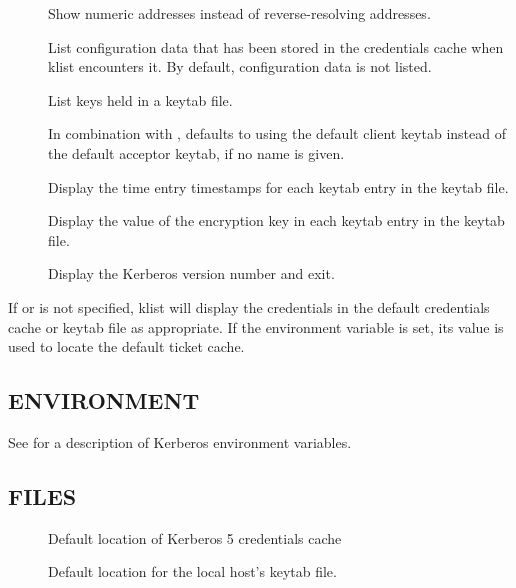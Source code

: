 \documentclass[letterpaper,10pt,english]{sphinxmanual}
\begin{document}
\begin{description}
\item[{}] \leavevmode
Show numeric addresses instead of reverse-resolving addresses.

\item[{}] \leavevmode
List configuration data that has been stored in the credentials
cache when klist encounters it.  By default, configuration data
is not listed.

\item[{}] \leavevmode
List keys held in a keytab file.

\item[{}] \leavevmode
In combination with , defaults to using the default client
keytab instead of the default acceptor keytab, if no name is
given.

\item[{}] \leavevmode
Display the time entry timestamps for each keytab entry in the
keytab file.

\item[{}] \leavevmode
Display the value of the encryption key in each keytab entry in
the keytab file.

\item[{}] \leavevmode
Display the Kerberos version number and exit.

\end{description}

If  or  is not specified, klist will display
the credentials in the default credentials cache or keytab file as
appropriate.  If the  environment variable is set, its
value is used to locate the default ticket cache.


\subsection{ENVIRONMENT}
\label{\detokenize{user/user_commands/klist:environment}}
See {\hyperref[\detokenize{user/user_config/kerberos:kerberos-7}]{}} for a description of Kerberos environment
variables.


\subsection{FILES}
\label{\detokenize{user/user_commands/klist:files}}\begin{description}
\item[{}] \leavevmode
Default location of Kerberos 5 credentials cache

\item[{}] \leavevmode
Default location for the local host’s keytab file.

\end{description}
\end{document}

